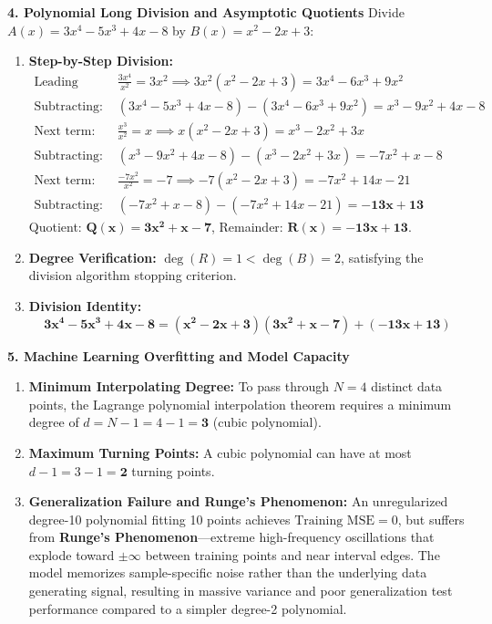 \textbf{4. Polynomial Long Division and Asymptotic Quotients}
Divide $A(x) = 3x^4 - 5x^3 + 4x - 8$ by $B(x) = x^2 - 2x + 3$:
\begin{enumerate}
    \item \textbf{Step-by-Step Division:}
    \begin{align*}
        \text{Leading term: } & \frac{3x^4}{x^2} = 3x^2 \implies 3x^2(x^2 - 2x + 3) = 3x^4 - 6x^3 + 9x^2 \\
        \text{Subtracting: } & (3x^4 - 5x^3 + 4x - 8) - (3x^4 - 6x^3 + 9x^2) = x^3 - 9x^2 + 4x - 8 \\
        \text{Next term: } & \frac{x^3}{x^2} = x \implies x(x^2 - 2x + 3) = x^3 - 2x^2 + 3x \\
        \text{Subtracting: } & (x^3 - 9x^2 + 4x - 8) - (x^3 - 2x^2 + 3x) = -7x^2 + x - 8 \\
        \text{Next term: } & \frac{-7x^2}{x^2} = -7 \implies -7(x^2 - 2x + 3) = -7x^2 + 14x - 21 \\
        \text{Subtracting: } & (-7x^2 + x - 8) - (-7x^2 + 14x - 21) = \mathbf{-13x + 13}
    \end{align*}
    Quotient: $\mathbf{Q(x) = 3x^2 + x - 7}$, Remainder: $\mathbf{R(x) = -13x + 13}$.
    \item \textbf{Degree Verification:} $\deg(R) = 1 < \deg(B) = 2$, satisfying the division algorithm stopping criterion.
    \item \textbf{Division Identity:}
    $$\mathbf{3x^4 - 5x^3 + 4x - 8 = (x^2 - 2x + 3)(3x^2 + x - 7) + (-13x + 13)}$$
\end{enumerate}

\textbf{5. Machine Learning Overfitting and Model Capacity}
\begin{enumerate}
    \item \textbf{Minimum Interpolating Degree:} To pass through $N = 4$ distinct data points, the Lagrange polynomial interpolation theorem requires a minimum degree of $d = N - 1 = 4 - 1 = \mathbf{3}$ (cubic polynomial).
    \item \textbf{Maximum Turning Points:} A cubic polynomial can have at most $d - 1 = 3 - 1 = \mathbf{2}$ turning points.
    \item \textbf{Generalization Failure and Runge's Phenomenon:} An unregularized degree-10 polynomial fitting 10 points achieves $\text{Training MSE} = 0$, but suffers from \textbf{Runge's Phenomenon}—extreme high-frequency oscillations that explode toward $\pm \infty$ between training points and near interval edges. The model memorizes sample-specific noise rather than the underlying data generating signal, resulting in massive variance and poor generalization test performance compared to a simpler degree-2 polynomial.
\end{enumerate}

